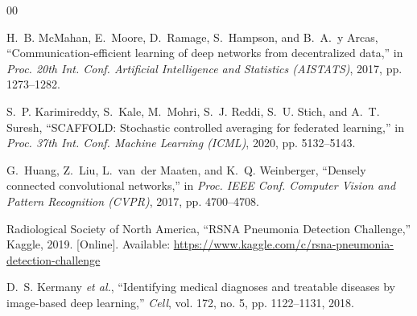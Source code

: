 \documentclass[conference]{IEEEtran}
\begin{document}
\begin{thebibliography}{00}

H.~B. McMahan, E.~Moore, D.~Ramage, S.~Hampson, and B.~A.~y Arcas,
``Communication-efficient learning of deep networks from decentralized
data,'' in \emph{Proc. 20th Int. Conf. Artificial Intelligence and
Statistics (AISTATS)}, 2017, pp. 1273--1282.

S.~P. Karimireddy, S.~Kale, M.~Mohri, S.~J. Reddi, S.~U. Stich, and
A.~T. Suresh, ``SCAFFOLD: Stochastic controlled averaging for federated
learning,'' in \emph{Proc. 37th Int. Conf. Machine Learning (ICML)}, 2020,
pp. 5132--5143.

G.~Huang, Z.~Liu, L.~van~der Maaten, and K.~Q. Weinberger, ``Densely
connected convolutional networks,'' in \emph{Proc. IEEE Conf. Computer
Vision and Pattern Recognition (CVPR)}, 2017, pp. 4700--4708.

Radiological Society of North America, ``RSNA Pneumonia Detection
Challenge,'' Kaggle, 2019. [Online]. Available:
\url{https://www.kaggle.com/c/rsna-pneumonia-detection-challenge}

D.~S. Kermany \emph{et al.}, ``Identifying medical diagnoses and treatable
diseases by image-based deep learning,'' \emph{Cell}, vol. 172, no. 5,
pp. 1122--1131, 2018.

\end{thebibliography}
\end{document}
